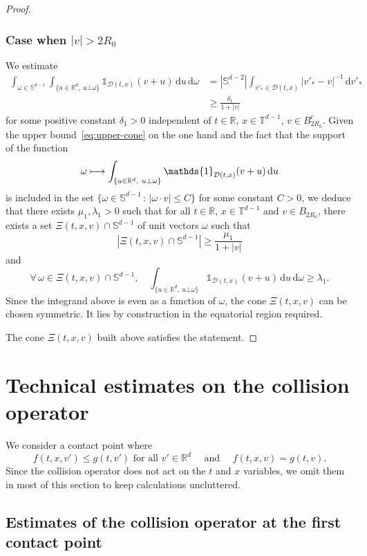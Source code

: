 \documentclass[JEP,XML,SOM,Unicode,NoFloatCountersInSection]{cedram}
\newcommand\mto{\mathchoice{\longmapsto}{\mapsto}{\mapsto}{\mapsto}}
\theoremstyle{plain}
\theoremstyle{definition}
\numberwithin{equation}{section}
\newcommand{\R}{\mathbb R}
\newcommand{\dd} {\, \mathrm{d}}
\newcommand{\one}{\mathds{1}}
\begin{document}
\begin{proof}
\subsubsection*{Case when $|v| > 2 R_0$}
We estimate
\begin{align*}
\int_{\omega \in \mathbb{S}^{d-1}} \int_{\{ u \in \R^{d}, \ u \bot
\omega \}} \one_{\mathcal{D}(t,x)}(v+u) \dd u \dd \omega
&=\left| \mathbb{S}^{d-2} \right| \int_{v'_* \in \mathcal{D}(t,x)}
|v'_*-v|^{-1} \dd v'_*\\
& \ge \frac{\delta_1}{1+|v|}
\end{align*}
for some positive constant $\delta_1 >0$ independent of $t \in \R$,
$x \in \mathbb{T}^{d-1}$, $v \in B_{2R_0}^c$. Given the upper
bound~\eqref{eq:upper-cone} on the one hand and the fact that the
support of the function
\[
\omega \mto \int_{\{ u \in \R^{d}, \ u \bot \omega \}}
\one_{\mathcal{D}(t,x)}(v+u) \dd u
\]
is included in the set $\{ \omega \in \mathbb{S}^{d-1} \, : \,
|\omega \cdot v| \le C\}$ for some constant $C>0$, we deduce that
there exists $\mu_1,\lambda_1>0$ such that for all $t \in \R$,
$x \in \mathbb{T}^{d-1}$ and $v \in B_{2R_0}$, there exists a set
$\Xi(t,x,v) \cap \mathbb{S}^{d-1}$ of unit vectors $\omega$ such
that
\[
\left| \Xi(t,x,v) \cap \mathbb{S}^{d-1} \right| \ge \frac{\mu_1}{1+|v|}
\]
and
\[
\forall \, \omega \in \Xi(t,x,v) \cap \mathbb{S}^{d-1}, \quad
\int_{\{ u \in \R^{d}, \ u \bot \omega \}}
\one_{\mathcal{D}(t,x)}(v+u) \dd u \dd \omega \ge \lambda_1.
\]
Since the integrand above is even as a function of $\omega$, the
cone $\Xi(t,x,v)$ can be chosen symmetric. It lies by construction
in the equatorial region required.

The cone $\Xi(t,x,v)$ built above satisfies the statement.
\end{proof}

\section{Technical estimates on the collision operator}
\label{s:estimates}

We consider a contact point where
\begin{equation}\label{eq:contact}
f (t,x,v') \le g (t,v') \text{ for all } v' \in \R^d \quad \text{ and } \quad f(t,x,v) = g(t,v).
\end{equation}
Since the collision operator does not act on the $t$ and $x$
variables, we omit them in most of this section to keep calculations
uncluttered.

\subsection{Estimates of the collision operator at the first contact point}
\end{document}
